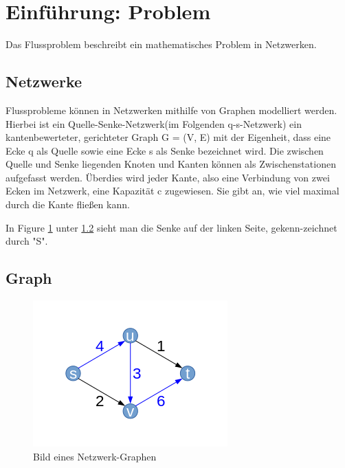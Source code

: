 \documentclass[11pt]{article}
\begin{document}
\newpage
\section{Einf\"uhrung: Problem}
\label{Problem}

Das Flussproblem beschreibt ein mathematisches Problem in Netzwerken.

\subsection{Netzwerke}
\label{Netzwerke}

Flussprobleme k\"onnen in Netzwerken mithilfe von Graphen modelliert werden. Hierbei ist ein Quelle-Senke-Netzwerk(im Folgenden q-s-Netzwerk) ein kantenbewerteter, gerichteter Graph G = (V, E) mit der Eigenheit, dass eine Ecke q als Quelle sowie eine Ecke s als Senke bezeichnet wird. Die zwischen Quelle und Senke liegenden Knoten und Kanten können als Zwischenstationen aufgefasst werden. \"Uberdies wird jeder Kante, also eine Verbindung von zwei Ecken im Netzwerk, eine Kapazität c zugewiesen. Sie gibt an, wie viel maximal durch die Kante fließen kann. \citep{Testref}

In Figure \ref{fig:Graph1} unter \ref{Graph} sieht man die Senke auf der linken Seite, gekenn-zeichnet durch "S". 

\subsection{Graph}
\label{Graph}

\begin{figure}[htbp] 
  \centering
     \includegraphics{graph1} 
  \caption{Bild eines Netzwerk-Graphen}
  \label{fig:Graph1}
\end{figure}




 
\end{document}
